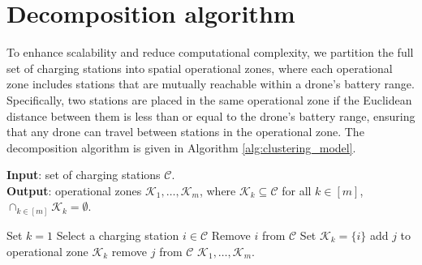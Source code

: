 \documentclass{article}
\newcommand{\set}[1]{\mathcal{#1}}
\begin{document}
\section{Decomposition algorithm}\label{appendix:decomposition alg}
To enhance scalability and reduce computational complexity, we partition the full set of charging stations into spatial operational zones, where each operational zone includes stations that are mutually reachable within a drone’s battery range. Specifically, two stations are placed in the same operational zone if the Euclidean distance between them is less than or equal to the drone's battery range, ensuring that any drone can travel between stations in the operational zone. The decomposition algorithm is given in Algorithm \ref{alg:clustering_model}.
 \begin{algorithm}[h]
        \caption{Decomposition model \label{alg:clustering_model}} 
        \textbf{Input}: set of charging stations $\set C$. \\ 
        \textbf{Output}: operational zones $\set K_1, \ldots, \set K_m$, where $\set K_k \subseteq \set C$ for all $k \in [m]$, $\cap_{k \in [m]} \set K_k = \emptyset$.

      \begin{algorithmic}[1]
            \STATE Set $k = 1$ 
            \WHILE{$\set C \neq \emptyset$}
            \STATE Select a charging station $i \in \set C$
            \STATE Remove $i$ from $\set C$
            \STATE Set $\set K_k = \{i\}$
            \FOR{$j \in \set C \setminus \{i\}$}
            \STATE add $j$ to operational zone $\set K_k$
            \STATE remove $j$ from $\set C$
            \ENDIF
            \ENDFOR
            \ENDWHILE
            \RETURN $\set K_1, \ldots, \set K_m$.
         \end{algorithmic}
    \end{algorithm}
\end{document}
